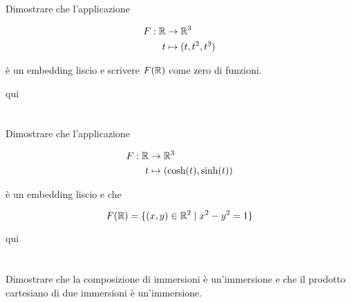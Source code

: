 \section{}\label{es2-19}

\begin{tcolorbox}
	Dimostrare che l'applicazione
	
	\begin{align}
		\begin{split}
			F : \mathbb{R} &\to \mathbb{R}^{3}\\
			t &\mapsto (t,t^{2},t^{3})
		\end{split}
	\end{align}
	
	è un embedding liscio e scrivere $ F(\mathbb{R}) $ come zero di funzioni.
\end{tcolorbox}

qui

%

\newpage

%

\section{}\label{es2-20}

\begin{tcolorbox}
	Dimostrare che l'applicazione
	
	\begin{align}
		\begin{split}
			F : \mathbb{R} &\to \mathbb{R}^{3}\\
			t &\mapsto (\cosh(t),\sinh(t))
		\end{split}
	\end{align}
	
	è un embedding liscio e che
	
	\begin{equation}
		F(\mathbb{R}) = \{ (x,y) \in \mathbb{R}^{2} \mid x^{2}-y^{2} = 1 \}
	\end{equation}
\end{tcolorbox}

qui

%

\newpage

%

\section{}\label{es2-21}

\begin{tcolorbox}
	Dimostrare che la composizione di immersioni è un’immersione e che il prodotto cartesiano di due immersioni è un’immersione.
\end{tcolorbox}

